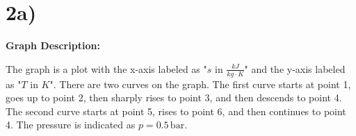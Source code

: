 

\section*{2a)}

\begin{center}
\textbf{Graph Description:}
\end{center}

The graph is a plot with the x-axis labeled as "$s$ in \(\frac{kJ}{kg \cdot K}\)" and the y-axis labeled as "$T$ in $K$". There are two curves on the graph. The first curve starts at point 1, goes up to point 2, then sharply rises to point 3, and then descends to point 4. The second curve starts at point 5, rises to point 6, and then continues to point 4. The pressure is indicated as $p = 0.5 \, \text{bar}$.